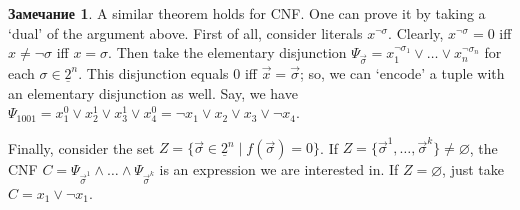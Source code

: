 \documentclass[12pt,notitlepage]{article}
\theoremstyle{plain}
\theoremstyle{definition}
\newtheorem{rem}[thm]{Замечание}
\theoremstyle{plain}
\newcommand{\void}{\varnothing}
\newcommand{\ul}[1]{\underline{#1}}
\newcommand{\1}{\mathbf{1}}
\newcommand{\0}{\mathbf{0}}
\begin{document}
\begin{rem}
	A similar theorem holds for CNF. One can prove it by taking a `dual' of the argument above. First of all, consider literals $x^{\neg \sigma}$. Clearly, $x^{\neg \sigma} = 0$ iff $x \neq \neg \sigma$ iff $x = \sigma$. Then take the elementary disjunction $\Psi_{\vec\sigma} = x^{\neg \sigma_1}_1 \vee \ldots \vee x^{\neg \sigma_n}_n$ for each $\sigma \in \ul{2}^n$. This disjunction equals $0$ iff $\vec x = \vec \sigma$; so, we can `encode' a tuple with an elementary disjunction as well. Say, we have $\Psi_{1001} = x^0_1 \vee x^1_2 \vee x^1_3 \vee x^0_4  = \neg x_1 \vee x_2 \vee x_3 \vee \neg x_4$.
	
	Finally, consider the set $Z = \{ \vec \sigma \in \ul{2}^n \mid f(\vec\sigma) = 0 \}$. If $Z = \{\vec\sigma^1, \ldots,  \vec\sigma^k\} \neq \void$, the CNF $C =  \Psi_{\vec \sigma^1} \wedge \ldots \wedge \Psi_{\vec \sigma^k}$ is an expression we are interested in. If $Z = \void$, just take $C = x_1 \vee \neg x_1$.
\end{rem}
\end{document}
